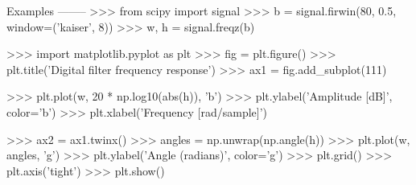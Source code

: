 \begin{DoxyVerb}
Examples
--------
>>> from scipy import signal
>>> b = signal.firwin(80, 0.5, window=('kaiser', 8))
>>> w, h = signal.freqz(b)

>>> import matplotlib.pyplot as plt
>>> fig = plt.figure()
>>> plt.title('Digital filter frequency response')
>>> ax1 = fig.add_subplot(111)

>>> plt.plot(w, 20 * np.log10(abs(h)), 'b')
>>> plt.ylabel('Amplitude [dB]', color='b')
>>> plt.xlabel('Frequency [rad/sample]')

>>> ax2 = ax1.twinx()
>>> angles = np.unwrap(np.angle(h))
>>> plt.plot(w, angles, 'g')
>>> plt.ylabel('Angle (radians)', color='g')
>>> plt.grid()
>>> plt.axis('tight')
>>> plt.show()\end{DoxyVerb}
 \hypertarget{namespacescipy_1_1signal_1_1filter__design_a9a14e1ac39675b0a66a7e2ef1d193b1b}{}
